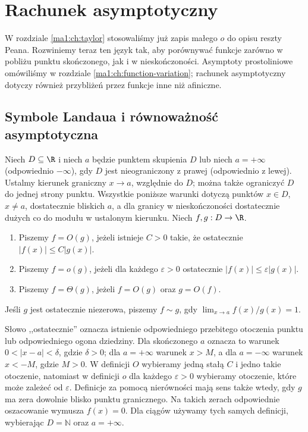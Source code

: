 \chapter{Rachunek asymptotyczny}
\label{ma1:ch:asymptotics}

W rozdziale \ref{ma1:ch:taylor} stosowaliśmy już zapis małego $o$ do opisu reszty Peana. Rozwiniemy teraz ten język tak, aby porównywać funkcje zarówno w pobliżu punktu skończonego, jak i w nieskończoności. Asymptoty prostoliniowe omówiliśmy w rozdziale \ref{ma1:ch:function-variation}; rachunek asymptotyczny dotyczy również przybliżeń przez funkcje inne niż afiniczne.

\section{Symbole Landaua i równoważność asymptotyczna}
\begin{definicja}
\label{ma1:def:landau}
Niech $D\subseteq\R$ i niech $a$ będzie punktem skupienia $D$ lub niech $a=+\infty$ (odpowiednio $-\infty$), gdy $D$ jest nieograniczony z prawej (odpowiednio z lewej). Ustalmy kierunek graniczny $x\to a$, względnie do $D$; można także ograniczyć $D$ do jednej strony punktu. Wszystkie poniższe warunki dotyczą punktów $x\in D$, $x\ne a$, dostatecznie bliskich $a$, a dla granicy w nieskończoności dostatecznie dużych co do modułu w ustalonym kierunku. Niech $f,g:D\to\R$.
\begin{enumerate}
 \item Piszemy $f=O(g)$, jeżeli istnieje $C>0$ takie, że ostatecznie $|f(x)|\le C|g(x)|$.
 \item Piszemy $f=o(g)$, jeżeli dla każdego $\varepsilon>0$ ostatecznie $|f(x)|\le\varepsilon|g(x)|$.
 \item Piszemy $f=\Theta(g)$, jeżeli $f=O(g)$ oraz $g=O(f)$.
\end{enumerate}
Jeśli $g$ jest ostatecznie niezerowa, piszemy $f\sim g$, gdy $\lim_{x\to a}f(x)/g(x)=1$.
\end{definicja}
Słowo ,,ostatecznie'' oznacza istnienie odpowiedniego przebitego otoczenia punktu lub odpowiedniego ogona dziedziny. Dla skończonego $a$ oznacza to warunek $0<|x-a|<\delta$, gdzie $\delta>0$; dla $a=+\infty$ warunek $x>M$, a dla $a=-\infty$ warunek $x<-M$, gdzie $M>0$. W definicji $O$ wybieramy jedną stałą $C$ i jedno takie otoczenie, natomiast w definicji $o$ dla każdego $\varepsilon>0$ wybieramy otoczenie, które może zależeć od $\varepsilon$. Definicje za pomocą nierówności mają sens także wtedy, gdy $g$ ma zera dowolnie blisko punktu granicznego. Na takich zerach odpowiednie oszacowanie wymusza $f(x)=0$. Dla ciągów używamy tych samych definicji, wybierając $D=\mathbb N$ oraz $a=+\infty$.

